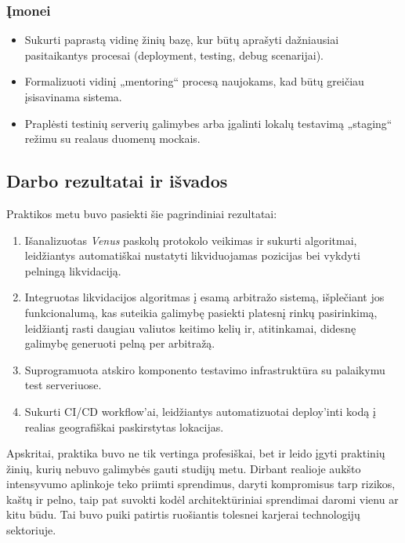 \documentclass[]{VUMIFTemplateClass}
\begin{document}
\subsubsection{Įmonei}

\begin{itemize}
    \item Sukurti paprastą vidinę žinių bazę, kur būtų aprašyti dažniausiai pasitaikantys procesai (deployment, testing, debug scenarijai).
    \item Formalizuoti vidinį „mentoring“ procesą naujokams, kad būtų greičiau įsisavinama sistema.
    \item Praplėsti testinių serverių galimybes arba įgalinti lokalų testavimą „staging“ režimu su realaus duomenų mockais.
\end{itemize}

\subsection{Darbo rezultatai ir išvados}

Praktikos metu buvo pasiekti šie pagrindiniai rezultatai:

\begin{enumerate}
  \item Išanalizuotas \textit{Venus} paskolų protokolo veikimas ir sukurti algoritmai, leidžiantys automatiškai nustatyti likviduojamas pozicijas bei vykdyti pelningą likvidaciją.
  \item Integruotas likvidacijos algoritmas į esamą arbitražo sistemą, išplečiant jos funkcionalumą, kas suteikia galimybę pasiekti platesnį rinkų pasirinkimą, leidžiantį rasti daugiau valiutos keitimo kelių ir, atitinkamai, didesnę galimybę generuoti pelną per arbitražą.
  \item Suprogramuota atskiro komponento testavimo infrastruktūra su palaikymu test serveriuose.
  \item Sukurti CI/CD workflow’ai, leidžiantys automatizuotai deploy’inti kodą į realias geografiškai paskirstytas lokacijas.
  \end{enumerate}

Apskritai, praktika buvo ne tik vertinga profesiškai, bet ir leido įgyti praktinių žinių, kurių nebuvo galimybės gauti studijų metu. Dirbant realioje aukšto intensyvumo aplinkoje teko priimti sprendimus, daryti kompromisus tarp rizikos, kaštų ir pelno, taip pat suvokti kodėl architektūriniai sprendimai daromi vienu ar kitu būdu. Tai buvo puiki patirtis ruošiantis tolesnei karjerai technologijų sektoriuje.
\end{document}

